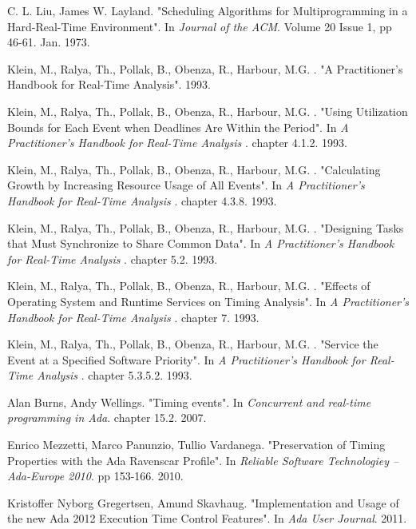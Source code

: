 \documentclass{article}
\begin{document}
\begin{thebibliography}{1}
C. L. Liu, James W. Layland.
\newblock "Scheduling Algorithms for Multiprogramming in a Hard-Real-Time Environment".
\newblock In {\em Journal of the ACM}. Volume 20 Issue 1, pp 46-61. Jan. 1973.

Klein, M., Ralya, Th., Pollak, B., Obenza, R., Harbour, M.G. .
\newblock "A Practitioner's Handbook for Real-Time Analysis". 1993.

Klein, M., Ralya, Th., Pollak, B., Obenza, R., Harbour, M.G. .
\newblock "Using Utilization Bounds for Each Event when Deadlines Are Within the Period".
\newblock In {\em A Practitioner's Handbook for Real-Time Analysis
}. chapter 4.1.2. 1993.

Klein, M., Ralya, Th., Pollak, B., Obenza, R., Harbour, M.G. .
\newblock "Calculating Growth by Increasing Resource Usage of All Events".
\newblock In {\em A Practitioner's Handbook for Real-Time Analysis
}. chapter 4.3.8. 1993.

Klein, M., Ralya, Th., Pollak, B., Obenza, R., Harbour, M.G. .
\newblock "Designing Tasks that Must Synchronize to Share Common Data".
\newblock In {\em A Practitioner's Handbook for Real-Time Analysis
}. chapter 5.2. 1993.

Klein, M., Ralya, Th., Pollak, B., Obenza, R., Harbour, M.G. .
\newblock "Effects of Operating System and Runtime Services on Timing Analysis".
\newblock In {\em A Practitioner's Handbook for Real-Time Analysis
}. chapter 7. 1993.

Klein, M., Ralya, Th., Pollak, B., Obenza, R., Harbour, M.G. .
\newblock "Service the Event at a Specified Software Priority".
\newblock In {\em A Practitioner's Handbook for Real-Time Analysis
}. chapter 5.3.5.2. 1993.

Alan Burns, Andy Wellings.
\newblock "Timing events".
\newblock In {\em Concurrent and real-time programming in Ada}. chapter 15.2. 2007.

Enrico Mezzetti, Marco Panunzio, Tullio Vardanega.
\newblock "Preservation of Timing Properties with the Ada Ravenscar Profile".
\newblock In {\em Reliable Software Technologiey – Ada-Europe 2010}. pp 153-166. 2010.

Kristoffer Nyborg Gregertsen, Amund Skavhaug.
\newblock "Implementation and Usage of the new Ada 2012 Execution Time Control Features".
\newblock In {\em Ada User Journal}. 2011.


\end{thebibliography}
\end{document}
